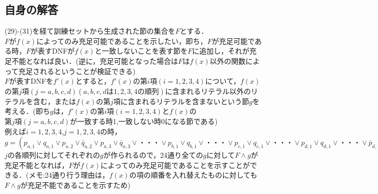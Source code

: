 \documentclass[dvipdfmx,a4paper,12pt]{jsarticle}
\begin{document}
   \subsection*{自身の解答}
   (29)-(31)を経て訓練セットから生成された節の集合を$F$とする．\\
   $F$が$f(x)$によってのみ充足可能であることを示したい，即ち，$F$が充足可能である時，$F$が表すDNFが$f(x)$と一致しないことを表す節を$F$に追加し，それが充足不能となれば良い．(逆に，充足可能となった場合は$F$は$f(x)$以外の関数によって充足されるということが検証できる)\\
  $F$が表すDNFを$f'(x)$とすると，$f'(x)$の$第i項(i=1,2,3,4)$について，$f(x)$の$第j項(j=a,b,c,d)(a,b,c,dは1,2,3,4の順列)$に含まれるリテラル以外のリテラルを含む，または$f(x)$の$第j項$に含まれるリテラルを含まないという節$g$を考える．(即ち$g$は，$f'(x)$の$第i項(i=1,2,3,4)$と$f(x)$の$第j項(j=a,b,c,d)$が一致する時1,一致しない時0になる節である)\\
  例えば$i=1,2,3,4$,$j=1,2,3,4$の時，\\
  $g=(p_{a,1} \lor q_{a,1} \lor p_{a,2} \lor \bar{q}_{a,2} \lor p_{a,3} \lor \bar{q}_{a,3} \lor ・・・\lor p_{b,1} \lor q_{b,1} \lor  ・・・\lor p_{c,1} \lor q_{c,1} \lor ・・・\lor p_{d,1} \lor q_{d,1} \lor ・・・\lor \bar{p}_{d,10} \lor q_{d,1} \lor ・・・\lor p_{d,20} \lor q_{d,20})$ \\
 $j$の各順列に対してそれぞれの$g$が作られるので，24通り全ての$g$に対して$F \land g$が充足不能となれば，$F$が$f(x)$によってのみ充足可能であることを示すことができる．(メモ:24通り行う理由は，$f(x)$の項の順番を入れ替えたものに対しても$F \land g$が充足不能であることを示すため)
\end{document}
